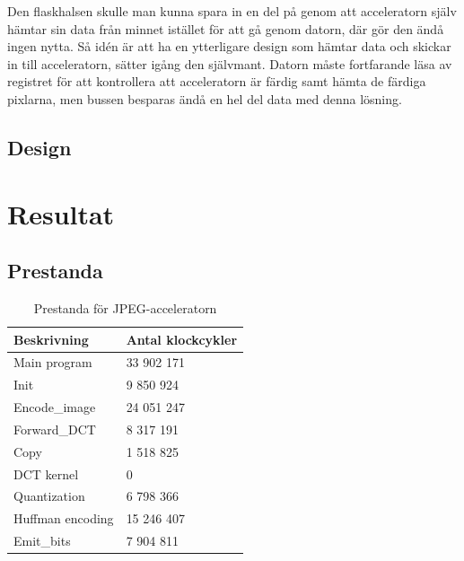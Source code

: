 \documentclass[a4paper]{article}
\begin{document}
Den flaskhalsen skulle man kunna spara in en del på genom att acceleratorn själv hämtar sin data från minnet istället för att gå genom datorn, där gör den ändå ingen nytta. Så idén är att ha en ytterligare design som hämtar data och skickar in till acceleratorn, sätter igång den självmant. Datorn måste fortfarande läsa av registret för att kontrollera att acceleratorn är färdig samt hämta de färdiga pixlarna, men bussen besparas ändå en hel del data med denna lösning.

\subsection{Design}


\section{Resultat}

\subsection{Prestanda}

\begin{table}[ht]
    \centering
    \begin{tabular}{l l}
    
        Beskrivning & Antal klockcykler\\
        \hline
        Main program  & 33 902 171 \\
        Init  &  9 850 924 \\
        Encode\_image  & 24 051 247 \\
        Forward\_DCT  & 8 317 191 \\
        Copy  & 1 518 825 \\
        DCT kernel  & 0 \\
        Quantization  & 6 798 366 \\
        Huffman encoding  & 15 246 407 \\
        Emit\_bits  &  7 904 811 \\
    \end{tabular}
    \caption{ Prestanda för JPEG-acceleratorn }
    \label{tab:jpeg_performance_2}
\end{table}
\end{document}

